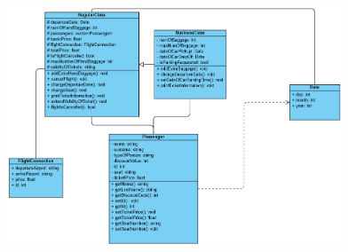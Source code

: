 \documentclass{article}
\begin{document}
\begin{center}
    \includegraphics[height=7.1cm]{imgs/1.png}    
\end{center}
\end{document}
